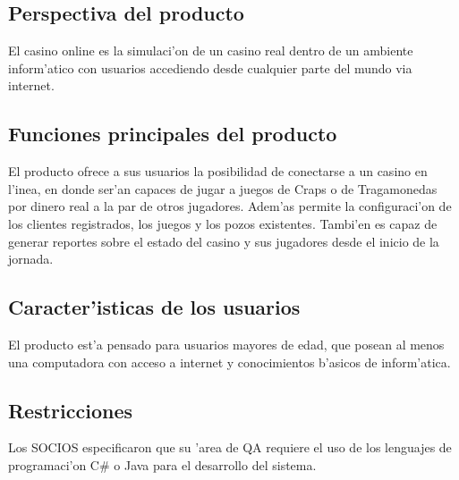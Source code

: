  \subsection{ Perspectiva del producto	}
El casino online es la simulaci'on de un casino real dentro de un ambiente inform'atico con usuarios accediendo desde cualquier parte del mundo via internet.

 \subsection{ Funciones principales del producto }
El producto ofrece a sus usuarios la posibilidad de conectarse a un casino en l'inea, en donde ser'an capaces de jugar a juegos de Craps o de Tragamonedas por dinero real a la par de otros jugadores. Adem'as permite la configuraci'on de los clientes registrados, los juegos y los pozos existentes. Tambi'en es capaz de generar reportes sobre el estado del casino y sus jugadores desde el inicio de la jornada.

 \subsection{ Caracter'isticas de los usuarios }
El producto est'a pensado para usuarios mayores de edad, que posean al menos una computadora con acceso a internet y conocimientos b'asicos de inform'atica.

 \subsection{ Restricciones }
Los SOCIOS especificaron que su 'area de QA requiere el uso de los lenguajes de programaci'on C\# o Java para el desarrollo del sistema.

